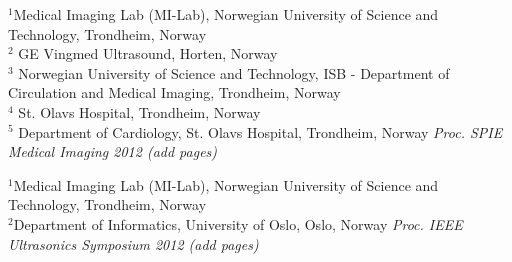 \documentclass[10pt,b5paper,twoside]{book}
\newcommand\todo[1]{{\textit{\color{red}(#1)}}}
\begin{document}
\begin{bibunit}[ieeetr]
{
$^{1}$Medical Imaging Lab (MI-Lab), Norwegian University of Science and Technology, Trondheim, Norway\\
$^{2}$ GE Vingmed Ultrasound, Horten, Norway\\
$^{3}$ Norwegian University of Science and Technology, ISB - Department of Circulation and Medical Imaging, Trondheim, Norway\\
$^{4}$ St. Olavs Hospital, Trondheim, Norway\\
$^{5}$ Department of Cardiology, St. Olavs Hospital, Trondheim, Norway
}
\noindent \textit{Proc. SPIE Medical Imaging 2012 \todo{add pages}}
%
\putbib[bibAdaptiveVolumeRendering]
\end{bibunit}

\begin{bibunit}[ieeetr]
{
	$^{1}$Medical Imaging Lab (MI-Lab), Norwegian University of Science and Technology, Trondheim, Norway\\
    	$^{2}$Department of Informatics, University of Oslo, Oslo, Norway
}
\noindent \textit{Proc. IEEE Ultrasonics Symposium 2012 \todo{add pages}}
%
\putbib[bibHos]
\end{bibunit}

\appendix
\end{document}
